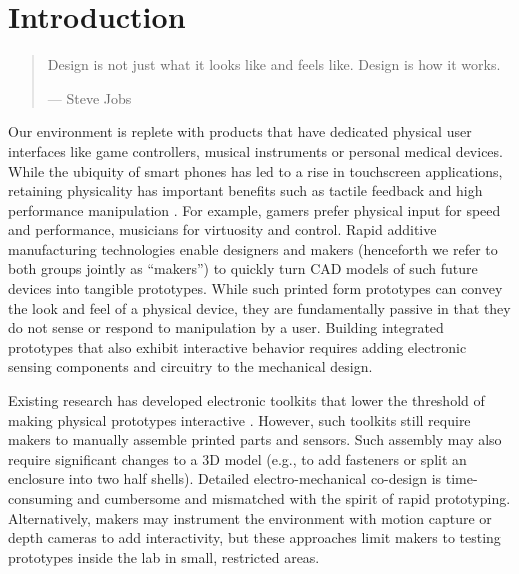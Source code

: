 \chapter{Introduction}

\begin{quote}
Design is not just what it looks like and feels like. Design is how it works.

--- Steve Jobs
\end{quote}

Our environment is replete with products that have dedicated physical user interfaces like game controllers, musical instruments or personal medical devices. While the ubiquity of smart phones has led to a rise in touchscreen applications, retaining physicality has important benefits such as tactile feedback and high performance manipulation \cite{klemmer-bodies}. For example, gamers prefer physical input for speed and performance, musicians for virtuosity and control. Rapid additive manufacturing technologies enable designers and makers (henceforth we refer to both groups jointly as ``makers'') to quickly turn CAD models of such future devices into tangible prototypes. While such printed form prototypes can convey the look and feel of a physical device, they are fundamentally passive in that they do not sense or respond to manipulation by a user. Building integrated prototypes that also exhibit interactive behavior requires adding electronic sensing components and circuitry to the mechanical design.

Existing research has developed electronic toolkits that lower the threshold of making physical prototypes interactive \cite{arduino,greenberg-phidgets}. However, such toolkits still require makers to manually assemble printed parts and sensors. Such assembly may also require significant changes to a 3D model (e.g., to add fasteners or split an enclosure into two half shells). Detailed electro-mechanical co-design is time-consuming and cumbersome and mismatched with the spirit of rapid prototyping. Alternatively, makers may instrument the environment with motion capture \cite{akaoka-displayobjects} or depth cameras \cite{wilson-depth} to add interactivity, but these approaches limit makers to testing prototypes inside the lab in small, restricted areas.

